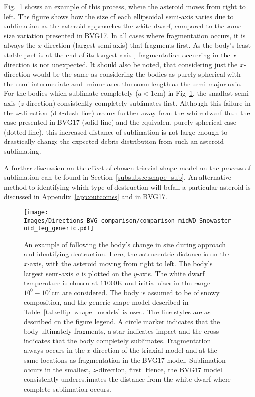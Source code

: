 \documentclass[fleqn,usenatbib]{mnras}
\begin{document}
Fig.~\ref{fig:comparison_plot} shows an example of this process, where the asteroid moves from right to left. 
The figure shows how the size of each ellipsoidal semi-axis varies due to sublimation as the asteroid approaches the white dwarf, compared to the same size variation presented in BVG17.
In all cases where fragmentation occurs, it is always the $x$-direction (largest semi-axis) that fragments first.
As the body's least stable part is at the end of its longest axis \citep{Harris1996}, fragmentation occurring in the $x$-direction is not unexpected.
It should also be noted, that considering just the $x$-direction would be the same as considering the bodies as purely spherical with the semi-intermediate and -minor axes the same length as the semi-major axis. 
For the bodies which sublimate completely ($a < 1$cm) in Fig~\ref{fig:comparison_plot}, the smallest semi-axis ($z$-direction) consistently completely sublimates first. 
Although this failure in the $z$-direction (dot-dash line) occurs further away from the white dwarf than the case presented in BVG17 (solid line) and the equivalent purely spherical case (dotted line), this increased distance of sublimation is not large enough to drastically change the expected debris distribution from such an asteroid sublimating.

A further discussion on the effect of chosen triaxial shape model on the process of sublimation can be found in Section~\ref{subsubsec:shape_sub}.
An alternative method to identifying which type of destruction will befall a particular asteroid is discussed in Appendix~\ref{app:outcomes} and in BVG17.

\begin{figure}
	\texttt{[image: Images/Directions\_BVG\_comparison/comparison\_midWD\_Snowasteroid\_leg\_generic.pdf]}
    \caption{An example of following the body's change in size during approach and identifying destruction.
    Here, the astrocentric distance is on the $x$-axis, with the asteroid moving from right to left. The body's largest semi-axis $a$ is plotted on the $y$-axis. 
    The white dwarf temperature is chosen at $11000$K and initial sizes in the range $10^0-10^7$cm are considered.
    The body is assumed to be of snowy composition, and the generic shape model described in Table~\ref{tab:ellip_shape_models} is used.
    The line styles are as described on the figure legend.
    A circle marker indicates that the body ultimately fragments, a star indicates impact and the cross indicates that the body completely sublimates. 
    Fragmentation always occurs in the $x$-direction of the triaxial model and at the same locations as fragmentation in the BVG17 model.
    Sublimation occurs in the smallest, $z$-direction, first. Hence, the BVG17 model consistently underestimates the distance from the white dwarf where complete sublimation occurs.}
    \label{fig:comparison_plot}
\end{figure}
\end{document}
